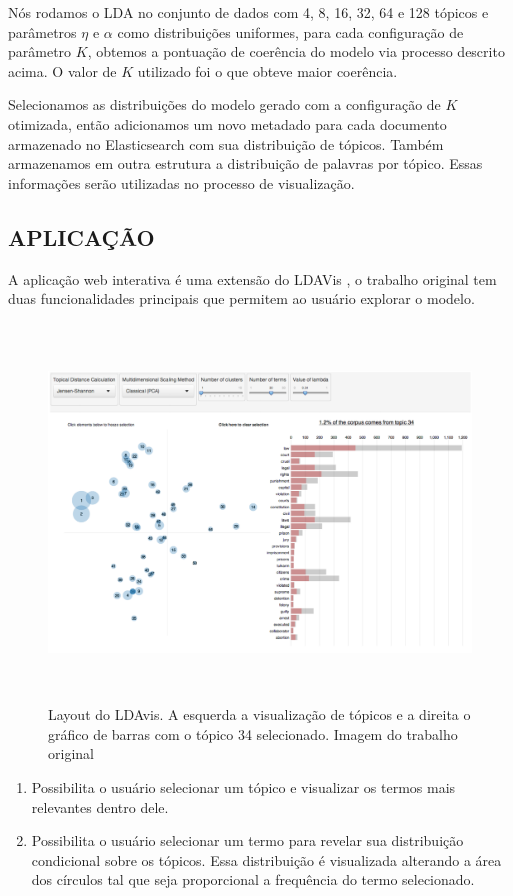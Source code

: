 \documentclass[12pt,a4paper]{article}
\begin{document}
Nós rodamos o LDA no conjunto de dados com 4, 8, 16, 32, 64 e 128 tópicos e parâmetros $\eta$ e $\alpha$ como distribuições uniformes, para cada configuração de parâmetro $K$,
 obtemos a pontuação de coerência do modelo via processo descrito acima. O valor de $K$ utilizado foi o que obteve maior coerência.

Selecionamos as distribuições do modelo gerado com a configuração de $K$ otimizada, então adicionamos um novo metadado para cada documento armazenado no Elasticsearch com sua distribuição de tópicos.
 Também armazenamos em outra estrutura a distribuição de palavras por tópico. Essas informações serão utilizadas no processo de visualização.

\subsection{APLICAÇÃO}
A aplicação web interativa é uma extensão do LDAVis \cite{sievert2014ldavis}, o trabalho original tem duas funcionalidades principais
que permitem ao usuário explorar o modelo.

\begin{figure}[H]
	\centering
    \includegraphics[height=10cm]{images/figure_4.png}
    \caption{Layout do LDAvis. A esquerda a visualização de tópicos e a direita o gráfico de barras com o tópico 34 selecionado. Imagem do trabalho original \cite{sievert2014ldavis}}
\end{figure}


\begin{enumerate}
  \item Possibilita o usuário selecionar um tópico e visualizar os termos mais relevantes dentro dele.
  \item Possibilita o usuário selecionar um termo para revelar sua distribuição condicional sobre os tópicos. Essa distribuição
  é visualizada alterando a área dos círculos tal que seja proporcional a frequência do termo selecionado.
\end{enumerate}
\end{document}
